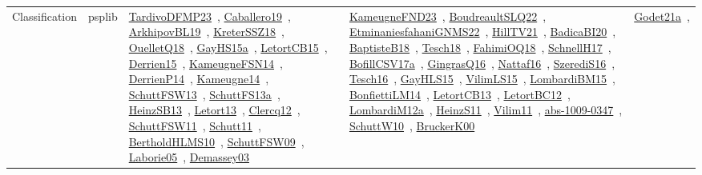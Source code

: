 {\begin{longtable}{lp{3cm}>{\raggedright\arraybackslash}p{6cm}>{\raggedright\arraybackslash}p{6cm}>{\raggedright\arraybackslash}p{8cm}}
\index{psplib}\index{Classification!psplib}Classification & psplib & \href{../works/TardivoDFMP23.pdf}{TardivoDFMP23}~\cite{TardivoDFMP23}, \href{../works/Caballero19.pdf}{Caballero19}~\cite{Caballero19}, \href{../works/ArkhipovBL19.pdf}{ArkhipovBL19}~\cite{ArkhipovBL19}, \href{../works/KreterSSZ18.pdf}{KreterSSZ18}~\cite{KreterSSZ18}, \href{../works/OuelletQ18.pdf}{OuelletQ18}~\cite{OuelletQ18}, \href{../works/GayHS15a.pdf}{GayHS15a}~\cite{GayHS15a}, \href{../works/LetortCB15.pdf}{LetortCB15}~\cite{LetortCB15}, \href{../works/Derrien15.pdf}{Derrien15}~\cite{Derrien15}, \href{../works/KameugneFSN14.pdf}{KameugneFSN14}~\cite{KameugneFSN14}, \href{../works/DerrienP14.pdf}{DerrienP14}~\cite{DerrienP14}, \href{../works/Kameugne14.pdf}{Kameugne14}~\cite{Kameugne14}, \href{../works/SchuttFSW13.pdf}{SchuttFSW13}~\cite{SchuttFSW13}, \href{../works/SchuttFS13a.pdf}{SchuttFS13a}~\cite{SchuttFS13a}, \href{../works/HeinzSB13.pdf}{HeinzSB13}~\cite{HeinzSB13}, \href{../works/Letort13.pdf}{Letort13}~\cite{Letort13}, \href{../works/Clercq12.pdf}{Clercq12}~\cite{Clercq12}, \href{../works/SchuttFSW11.pdf}{SchuttFSW11}~\cite{SchuttFSW11}, \href{../works/Schutt11.pdf}{Schutt11}~\cite{Schutt11}, \href{../works/BertholdHLMS10.pdf}{BertholdHLMS10}~\cite{BertholdHLMS10}, \href{../works/SchuttFSW09.pdf}{SchuttFSW09}~\cite{SchuttFSW09}, \href{../works/Laborie05.pdf}{Laborie05}~\cite{Laborie05}, \href{../works/Demassey03.pdf}{Demassey03}~\cite{Demassey03} & \href{../works/KameugneFND23.pdf}{KameugneFND23}~\cite{KameugneFND23}, \href{../works/BoudreaultSLQ22.pdf}{BoudreaultSLQ22}~\cite{BoudreaultSLQ22}, \href{../works/EtminaniesfahaniGNMS22.pdf}{EtminaniesfahaniGNMS22}~\cite{EtminaniesfahaniGNMS22}, \href{../works/HillTV21.pdf}{HillTV21}~\cite{HillTV21}, \href{../works/BadicaBI20.pdf}{BadicaBI20}~\cite{BadicaBI20}, \href{../works/BaptisteB18.pdf}{BaptisteB18}~\cite{BaptisteB18}, \href{../works/Tesch18.pdf}{Tesch18}~\cite{Tesch18}, \href{../works/FahimiOQ18.pdf}{FahimiOQ18}~\cite{FahimiOQ18}, \href{../works/SchnellH17.pdf}{SchnellH17}~\cite{SchnellH17}, \href{../works/BofillCSV17a.pdf}{BofillCSV17a}~\cite{BofillCSV17a}, \href{../works/GingrasQ16.pdf}{GingrasQ16}~\cite{GingrasQ16}, \href{../works/Nattaf16.pdf}{Nattaf16}~\cite{Nattaf16}, \href{../works/SzerediS16.pdf}{SzerediS16}~\cite{SzerediS16}, \href{../works/Tesch16.pdf}{Tesch16}~\cite{Tesch16}, \href{../works/GayHLS15.pdf}{GayHLS15}~\cite{GayHLS15}, \href{../works/VilimLS15.pdf}{VilimLS15}~\cite{VilimLS15}, \href{../works/LombardiBM15.pdf}{LombardiBM15}~\cite{LombardiBM15}, \href{../works/BonfiettiLM14.pdf}{BonfiettiLM14}~\cite{BonfiettiLM14}, \href{../works/LetortCB13.pdf}{LetortCB13}~\cite{LetortCB13}, \href{../works/LetortBC12.pdf}{LetortBC12}~\cite{LetortBC12}, \href{../works/LombardiM12a.pdf}{LombardiM12a}~\cite{LombardiM12a}, \href{../works/HeinzS11.pdf}{HeinzS11}~\cite{HeinzS11}, \href{../works/Vilim11.pdf}{Vilim11}~\cite{Vilim11}, \href{../works/abs-1009-0347.pdf}{abs-1009-0347}~\cite{abs-1009-0347}, \href{../works/SchuttW10.pdf}{SchuttW10}~\cite{SchuttW10}, \href{../works/BruckerK00.pdf}{BruckerK00}~\cite{BruckerK00} & \href{../works/Godet21a.pdf}{Godet21a}~\cite{Godet21a}, 
\end{longtable}}
